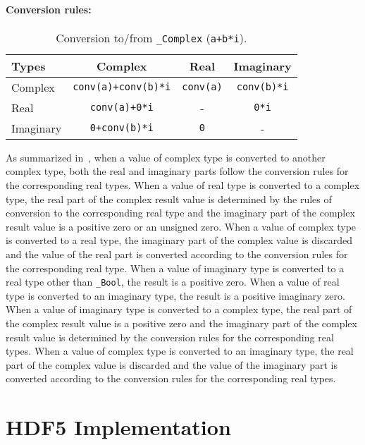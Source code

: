 \documentclass[letterpaper,hyper]{THG_RFC}
\begin{document}
\paragraph{Conversion rules:}
\begin{table}[ht]\footnotesize
\caption{Conversion to/from \texttt{\_Complex} (\texttt{a+b*i}).}
\label{tab:complex_convert}
\begin{tabular}{lccc} \toprule
Types     & Complex                    & Real             & Imaginary          \\
\midrule
Complex   & \texttt{conv(a)+conv(b)*i} & \texttt{conv(a)} & \texttt{conv(b)*i} \\
Real      & \texttt{conv(a)+0*i}       & -                & \texttt{0*i}       \\
Imaginary & \texttt{0+conv(b)*i}       & \texttt{0}       & -                  \\
\bottomrule
\end{tabular}
\end{table}
As summarized in~,
when a value of complex type is converted to another complex type, both the real
and imaginary parts follow the conversion rules for the corresponding real types.
When a value of real type is converted to a complex type, the real part of the
complex result value is determined by the rules of conversion to the
corresponding real type and the imaginary part of the complex result value is a
positive zero or an unsigned zero.
When a value of complex type is converted to a real type, the imaginary part of
the complex value is discarded and the value of the real part is converted
according to the conversion rules for the corresponding real type.
When a value of imaginary type is converted to a real type other than
\texttt{\_Bool}, the result is a positive zero.
When a value of real type is converted to an imaginary type, the result is a
positive imaginary zero.
When a value of imaginary type is converted to a complex type, the real part of
the complex result value is a positive zero and the imaginary part of the
complex result value is determined by the conversion rules for the
corresponding real types.
When a value of complex type is converted to an imaginary type, the real part
of the complex value is discarded and the value of the imaginary part is
converted according to the conversion rules for the corresponding real types.

\section{HDF5 Implementation}
\end{document}
